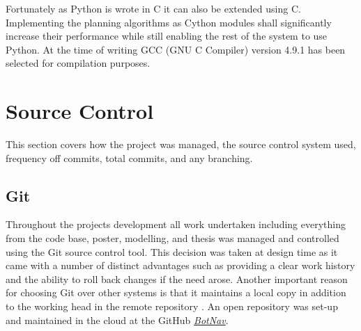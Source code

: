 \noindent
Fortunately as Python is wrote in C it can also be extended using C. Implementing the planning algorithms as Cython modules shall significantly increase their performance while still enabling the rest of the system to use Python. At the time of writing GCC (GNU C Compiler) version 4.9.1 has been selected for compilation purposes.


\newpage

\section{Source Control}
This section covers how the project was managed, the source control system used, frequency off commits, total commits, and any branching.

\subsection{Git}
\noindent
Throughout the projects development all work undertaken including everything from the code base, poster, modelling, and thesis was managed and controlled using the Git source control tool. This decision was taken at design time as it came with a number of distinct advantages such as providing a clear work history and the ability to roll back changes if the need arose. Another important reason for choosing Git over other systems is that it maintains a local copy in addition to the working head in the remote repository \cite{GIT}. An open repository was set-up and maintained in the cloud at the GitHub \href{https://www.github.com/swordmaster2k/botnav}{\textit{BotNav}}.

\newpage

